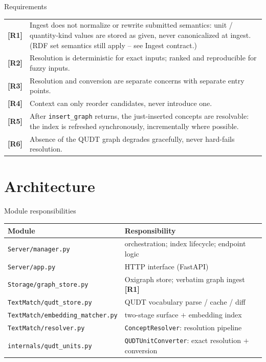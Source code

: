 \documentclass[aspectratio=169]{beamer}
\newcommand{\code}[1]{\texttt{\small #1}}
\newcommand{\req}[1]{\textbf{[#1]}}
\begin{document}
\begin{frame}{Requirements}
  \small
  \begin{tabular}{@{}p{}p{}@{}}
    \hline
    \req{R1} & Ingest does not normalize or rewrite submitted semantics:
      unit / quantity-kind values are stored as given, never canonicalized
      at ingest. (RDF set semantics still apply -- see Ingest contract.) \\
    \req{R2} & Resolution is deterministic for exact inputs; ranked and
      reproducible for fuzzy inputs. \\
    \req{R3} & Resolution and conversion are separate concerns with
      separate entry points. \\
    \req{R4} & Context can only reorder candidates, never introduce one. \\
    \req{R5} & After \code{insert\_graph} returns, the just-inserted
      concepts are resolvable: the index is refreshed synchronously,
      incrementally where possible. \\
    \req{R6} & Absence of the QUDT graph degrades gracefully, never
      hard-fails resolution. \\ \hline
  \end{tabular}
\end{frame}

\section{Architecture}

\begin{frame}{Module responsibilities}
  \small
  \begin{tabular}{@{}p{}p{}@{}}
    \hline
    \textbf{Module} & \textbf{Responsibility} \\ \hline
    \code{Server/manager.py} & orchestration; index lifecycle; endpoint
        logic \\
    \code{Server/app.py} & HTTP interface (FastAPI) \\
    \code{Storage/graph\_store.py} & Oxigraph store; verbatim graph ingest
        \req{R1} \\
    \code{TextMatch/qudt\_store.py} & QUDT vocabulary parse / cache / diff \\
    \code{TextMatch/embedding\_matcher.py} & two-stage surface $+$
        embedding index \\
    \code{TextMatch/resolver.py} & \code{ConceptResolver}: resolution
        pipeline \\
    \code{internals/qudt\_units.py} & \code{QUDTUnitConverter}: exact
        resolution $+$ conversion \\ \hline
  \end{tabular}
\end{frame}
\end{document}
